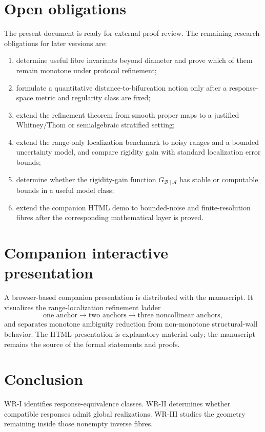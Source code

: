 \documentclass[11pt]{article}
\newcommand{\Acal}{\mathcal A}
\newcommand{\Bcal}{\mathcal B}
\begin{document}
\section{Open obligations}

The present document is ready for external proof review. The remaining
research obligations for later versions are:

\begin{enumerate}
\item determine useful fibre invariants beyond diameter and prove which of
them remain monotone under protocol refinement;
\item formulate a quantitative distance-to-bifurcation notion only after a
response-space metric and regularity class are fixed;
\item extend the refinement theorem from smooth proper maps to a justified
Whitney/Thom or semialgebraic stratified setting;
\item extend the range-only localization benchmark to noisy ranges and a
bounded uncertainty model, and compare rigidity gain with standard localization
error bounds;
\item determine whether the rigidity-gain function
\(G_{\Bcal\mid\Acal}\) has stable or computable bounds in a useful model
class;
\item extend the companion HTML demo to bounded-noise and finite-resolution
fibres after the corresponding mathematical layer is proved.
\end{enumerate}

\section{Companion interactive presentation}

A browser-based companion presentation is distributed with the manuscript.
It visualizes the range-localization refinement ladder
\[
\text{one anchor}
\longrightarrow
\text{two anchors}
\longrightarrow
\text{three noncollinear anchors},
\]
and separates monotone ambiguity reduction from non-monotone structural-wall
behavior. The HTML presentation is explanatory material only; the manuscript
remains the source of the formal statements and proofs.

\section*{Conclusion}

WR-I identifies response-equivalence classes. WR-II determines whether
compatible responses admit global realizations. WR-III studies the geometry
remaining inside those nonempty inverse fibres.
\end{document}
